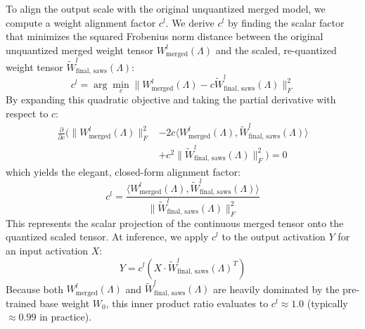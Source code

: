 To align the output scale with the original unquantized merged model, we compute a weight alignment factor $c^l$. We derive $c^l$ by finding the scalar factor that minimizes the squared Frobenius norm distance between the original unquantized merged weight tensor $W^l_{\text{merged}}(\Lambda)$ and the scaled, re-quantized weight tensor $\tilde{W}^l_{\text{final, saws}}(\Lambda)$:
\begin{equation}
  c^l = \arg\min_{c} \| W^l_{\text{merged}}(\Lambda) - c \tilde{W}^l_{\text{final, saws}}(\Lambda) \|^2_F
\end{equation}
By expanding this quadratic objective and taking the partial derivative with respect to $c$:
\begin{equation}
  \begin{split}
    \frac{\partial}{\partial c} \Big( \|W^l_{\text{merged}}(\Lambda)\|^2_F &- 2 c \langle W^l_{\text{merged}}(\Lambda), \tilde{W}^l_{\text{final, saws}}(\Lambda) \rangle \\
    &+ c^2 \|\tilde{W}^l_{\text{final, saws}}(\Lambda)\|^2_F \Big) = 0
  \end{split}
\end{equation}
which yields the elegant, closed-form alignment factor:
\begin{equation}
  c^l = \frac{\langle W^l_{\text{merged}}(\Lambda), \tilde{W}^l_{\text{final, saws}}(\Lambda) \rangle}{\|\tilde{W}^l_{\text{final, saws}}(\Lambda)\|^2_F}
\end{equation}
This represents the scalar projection of the continuous merged tensor onto the quantized scaled tensor. At inference, we apply $c^l$ to the output activation $Y$ for an input activation $X$:
\begin{equation}
  Y = c^l \left( X \cdot \tilde{W}^l_{\text{final, saws}}(\Lambda)^T \right)
\end{equation}
Because both $W^l_{\text{merged}}(\Lambda)$ and $\tilde{W}^l_{\text{final, saws}}(\Lambda)$ are heavily dominated by the pre-trained base weight $W_0$, this inner product ratio evaluates to $c^l \approx 1.0$ (typically $\approx 0.99$ in practice).

